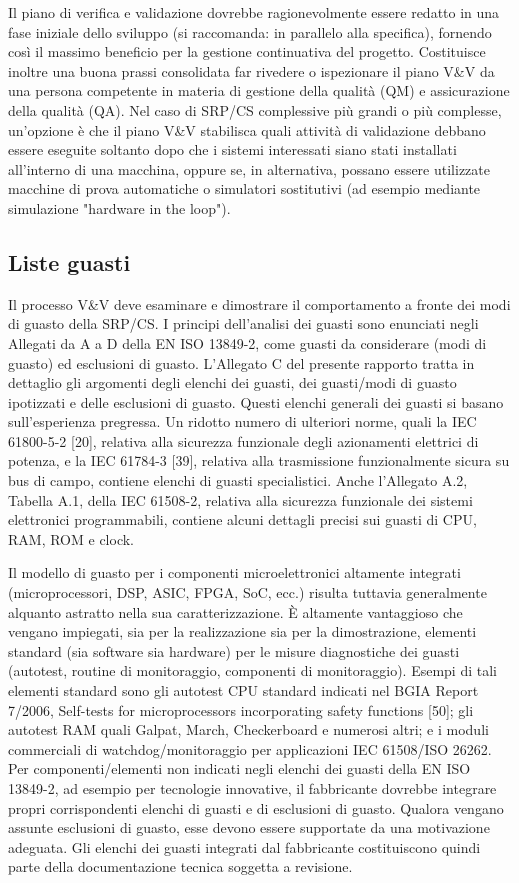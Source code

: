 Il piano di verifica e validazione dovrebbe ragionevolmente essere redatto in una fase iniziale dello sviluppo (si raccomanda: in parallelo alla specifica), fornendo così il massimo beneficio per la gestione continuativa del progetto. Costituisce inoltre una buona prassi consolidata far rivedere o ispezionare il piano V\&V da una persona competente in materia di gestione della qualità (QM) e assicurazione della qualità (QA).
Nel caso di SRP/CS complessive più grandi o più complesse, un'opzione è che il piano V\&V stabilisca quali attività di validazione debbano essere eseguite soltanto dopo che i sistemi interessati siano stati installati all'interno di una macchina, oppure se, in alternativa, possano essere utilizzate macchine di prova automatiche o simulatori sostitutivi (ad esempio mediante simulazione "hardware in the loop").

\subsection{Liste guasti}
\label{subsec:07-1-3}
Il processo V\&V deve esaminare e dimostrare il comportamento a fronte dei modi di guasto della SRP/CS. I principi dell'analisi dei guasti sono enunciati negli Allegati da A a D della EN ISO 13849-2, come guasti da considerare (modi di guasto) ed esclusioni di guasto. L'Allegato C del presente rapporto tratta in dettaglio gli argomenti degli elenchi dei guasti, dei guasti/modi di guasto ipotizzati e delle esclusioni di guasto. Questi elenchi generali dei guasti si basano sull'esperienza pregressa. Un ridotto numero di ulteriori norme, quali la IEC 61800-5-2 [20], relativa alla sicurezza funzionale degli azionamenti elettrici di potenza, e la IEC 61784-3 [39], relativa alla trasmissione funzionalmente sicura su bus di campo, contiene elenchi di guasti specialistici. Anche l'Allegato A.2, Tabella A.1, della IEC 61508-2, relativa alla sicurezza funzionale dei sistemi elettronici programmabili, contiene alcuni dettagli precisi sui guasti di CPU, RAM, ROM e clock.

Il modello di guasto per i componenti microelettronici altamente integrati (microprocessori, DSP, ASIC, FPGA, SoC, ecc.) risulta tuttavia generalmente alquanto astratto nella sua caratterizzazione. È altamente vantaggioso che vengano impiegati, sia per la realizzazione sia per la dimostrazione, elementi standard (sia software sia hardware) per le misure diagnostiche dei guasti (autotest, routine di monitoraggio, componenti di monitoraggio). Esempi di tali elementi standard sono gli autotest CPU standard indicati nel BGIA Report 7/2006, Self-tests for microprocessors incorporating safety functions [50]; gli autotest RAM quali Galpat, March, Checkerboard e numerosi altri; e i moduli commerciali di watchdog/monitoraggio per applicazioni IEC 61508/ISO 26262. Per componenti/elementi non indicati negli elenchi dei guasti della EN ISO 13849-2, ad esempio per tecnologie innovative, il fabbricante dovrebbe integrare propri corrispondenti elenchi di guasti e di esclusioni di guasto. Qualora vengano assunte esclusioni di guasto, esse devono essere supportate da una motivazione adeguata. Gli elenchi dei guasti integrati dal fabbricante costituiscono quindi parte della documentazione tecnica soggetta a revisione.

